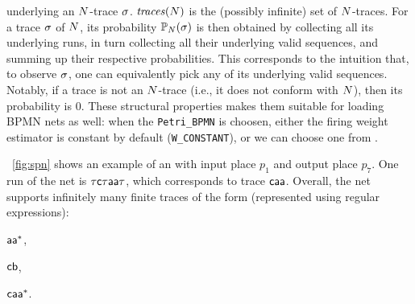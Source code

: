   underlying an $N$-trace $\sigma$.
   $\mathit{traces}(N)$ is the (possibly infinite) set of $N$-traces. For a trace $\sigma$ of $N$, its probability $\mathbb{P}_{N}(\sigma)$ is then obtained by collecting all its underlying runs, in turn collecting all their underlying valid sequences, and summing up their respective probabilities. %
    This corresponds to the intuition that, to observe $\sigma$, one can equivalently pick any of its underlying valid sequences. Notably, if a trace is not an $N$-trace (i.e., it does not conform with $N$), then its probability is 0.
 These structural properties makes them suitable for loading BPMN nets as well: when the \texttt{Petri\_BPMN} is choosen, either the firing weight estimator is constant by default (\texttt{W\_CONSTANT}), or we can choose one from \cite{spdwe}.
\begin{example} %
\label{ex:net}
\figurename~\ref{fig:spn} shows an example of an \uswn with input place $p_1$ and output place $p_7$. One run of the net is $\mathsf{\tau c \tau a a \tau}$, which corresponds to trace $\mathsf{caa}$. Overall, the net supports infinitely many finite traces of the form (represented using regular expressions):
\begin{inparaenum}[\it (i)]
\item $\mathsf{aa^*}$,
\item $\mathsf{cb}$,
\item $\mathsf{caa^*}$.
\end{inparaenum}
\end{example}


